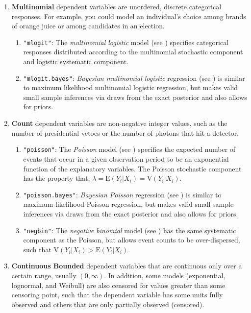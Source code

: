 \begin{enumerate}
 \item {\bf Multinomial} dependent variables are unordered, discrete
   categorical responses.  For example, you could model an
   individual's choice among brands of orange juice or among
   candidates in an election.
    \begin{enumerate}
    \item {\tt "mlogit"}: The {\it multinomial logistic} model (see
      ) specifies categorical responses distributed
      according to the multinomial stochastic component and logistic
      systematic component.
    \item {\tt "mlogit.bayes"}: {\it Bayesian multinomial logistic} regression (see
) is similar to maximum likelihood multinomial logistic
regression, but makes valid small sample inferences via draws from the
exact posterior and also allows for priors. 
    \end{enumerate}
  \item {\bf Count} dependent variables are non-negative integer
values, such as the number of presidential vetoes or the number of
photons that hit a detector. 
    \begin{enumerate}
    \item {\tt "poisson"}: The {\it Poisson} model (see
      ) specifies the expected number of events that
      occur in a given observation period to be an exponential
      function of the explanatory variables.  The Poisson stochastic
      component has the property that, $\lambda = \textrm{E}(Y_i|X_i)
      = \textrm{V}(Y_i|X_i)$.
    \item {\tt "poisson.bayes"}: {\it Bayesian Poisson} regression (see
) is similar to maximum likelihood Poisson
regression, but makes valid small sample inferences via draws from the
exact posterior and also allows for priors. 
    \item {\tt "negbin"}: The {\it negative binomial} model (see
      ) has the same systematic component as the Poisson,
      but allows event counts to be over-dispersed, such that
      $\textrm{V}(Y_i|X_i) > \textrm{E}(Y_i|X_i)$.
    \end{enumerate}

  \item {\bf Continuous Bounded}\label{duration} dependent variables
that are continuous only over a certain range, usually $(0, \infty)$.
In addition, some models (exponential, lognormal, and
Weibull) are also censored for values greater than some censoring
point, such that the dependent variable has some units fully observed
and others that are only partially observed (censored).  


\end{enumerate}
